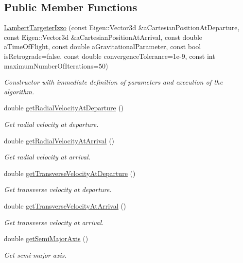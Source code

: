 \subsection*{Public Member Functions}
\begin{DoxyCompactItemize}
\item 
\hyperlink{classtudat_1_1mission__segments_1_1LambertTargeterIzzo_ad660e3634e3f021cc17e4c7ae7564eb6}{Lambert\+Targeter\+Izzo} (const Eigen\+::\+Vector3d \&a\+Cartesian\+Position\+At\+Departure, const Eigen\+::\+Vector3d \&a\+Cartesian\+Position\+At\+Arrival, const double a\+Time\+Of\+Flight, const double a\+Gravitational\+Parameter, const bool is\+Retrograde=false, const double convergence\+Tolerance=1e-\/9, const int maximum\+Number\+Of\+Iterations=50)
\begin{DoxyCompactList}\small\item\em Constructor with immediate definition of parameters and execution of the algorithm. \end{DoxyCompactList}\item 
double \hyperlink{classtudat_1_1mission__segments_1_1LambertTargeterIzzo_abad3427d519bc98b15567e1573163a93}{get\+Radial\+Velocity\+At\+Departure} ()
\begin{DoxyCompactList}\small\item\em Get radial velocity at departure. \end{DoxyCompactList}\item 
double \hyperlink{classtudat_1_1mission__segments_1_1LambertTargeterIzzo_a0c5f399909e2e930dae9a98cd5d01746}{get\+Radial\+Velocity\+At\+Arrival} ()
\begin{DoxyCompactList}\small\item\em Get radial velocity at arrival. \end{DoxyCompactList}\item 
double \hyperlink{classtudat_1_1mission__segments_1_1LambertTargeterIzzo_a28a61b1f42cee3c59360c80f7b1f4d6e}{get\+Transverse\+Velocity\+At\+Departure} ()
\begin{DoxyCompactList}\small\item\em Get transverse velocity at departure. \end{DoxyCompactList}\item 
double \hyperlink{classtudat_1_1mission__segments_1_1LambertTargeterIzzo_a8627ebb8af6b7a9112cb8d4c125602e7}{get\+Transverse\+Velocity\+At\+Arrival} ()
\begin{DoxyCompactList}\small\item\em Get transverse velocity at arrival. \end{DoxyCompactList}\item 
double \hyperlink{classtudat_1_1mission__segments_1_1LambertTargeterIzzo_aee1bcc293abb0c136ad3153c30a341fe}{get\+Semi\+Major\+Axis} ()
\begin{DoxyCompactList}\small\item\em Get semi-\/major axis. \end{DoxyCompactList}\end{DoxyCompactItemize}
